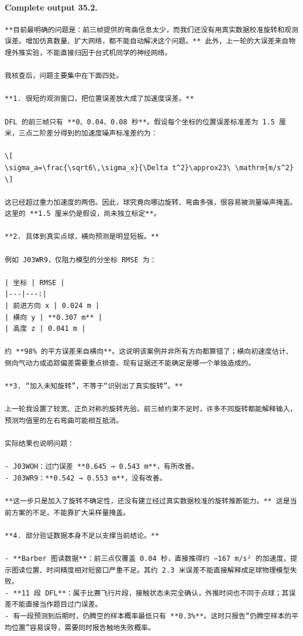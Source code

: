 \documentclass[UTF8,10pt]{ctexart}
\begin{document}
\paragraph{Complete output 35.2.}
\begin{Verbatim}[breaklines=true,breakanywhere=true,fontsize=\scriptsize,frame=single,framesep=2pt]
**目前最明确的问题是：前三帧提供的弯曲信息太少，而我们还没有用真实数据校准旋转和观测误差。增加仿真数量、扩大网络，都不能自动解决这个问题。** 此外，上一轮的大误差来自物理外推实验，不能直接归因于台式机同学的神经网络。

我核查后，问题主要集中在下面四处。

**1. 很短的观测窗口，把位置误差放大成了加速度误差。**

DFL 的前三帧只有 **0、0.04、0.08 秒**。假设每个坐标的位置误差标准差为 1.5 厘米，三点二阶差分得到的加速度噪声标准差约为：

\[
\sigma_a=\frac{\sqrt6\,\sigma_x}{\Delta t^2}\approx23\ \mathrm{m/s^2}
\]

这已经超过重力加速度的两倍。因此，球究竟向哪边旋转、弯曲多强，很容易被测量噪声掩盖。这里的 **1.5 厘米仍是假设，尚未独立标定**。

**2. 具体到真实点球，横向预测是明显短板。**

例如 J03WR9，仅阻力模型的分坐标 RMSE 为：

| 坐标 | RMSE |
|---|---:|
| 前进方向 x | 0.024 m |
| 横向 y | **0.307 m** |
| 高度 z | 0.041 m |

约 **98% 的平方误差来自横向**。这说明该案例并非所有方向都算错了；横向初速度估计、侧向气动力或追踪偏差需要重点排查。现有证据还不能确定是哪一个单独造成的。

**3. “加入未知旋转”，不等于“识别出了真实旋转”。**

上一轮我设置了较宽、正负对称的旋转先验。前三帧约束不足时，许多不同旋转都能解释输入，预测均值里的左右弯曲可能相互抵消。

实际结果也说明问题：

- J03WOH：过门误差 **0.645 → 0.543 m**，有所改善。
- J03WR9：**0.542 → 0.553 m**，没有改善。

**这一步只是加入了旋转不确定性，还没有建立经过真实数据校准的旋转推断能力。** 这是当前方案的不足，不能靠扩大采样量掩盖。

**4. 部分验证数据本身不足以支撑当前结论。**

- **Barber 图读数据**：前三点仅覆盖 0.04 秒，直接推得约 −167 m/s² 的加速度，提示图读位置、时间精度相对短窗口严重不足。其约 2.3 米误差不能直接解释成足球物理模型失败。
- **11 段 DFL**：属于比赛飞行片段，接触状态未完全确认，外推时间也不同于点球；其误差不能直接当作题目过门误差。
- 有一段预测到后期时，仍腾空的样本概率最低只有 **0.3%**。这时只报告“仍腾空样本的平均位置”容易误导，需要同时报告触地失败概率。


\end{Verbatim}
\end{document}
